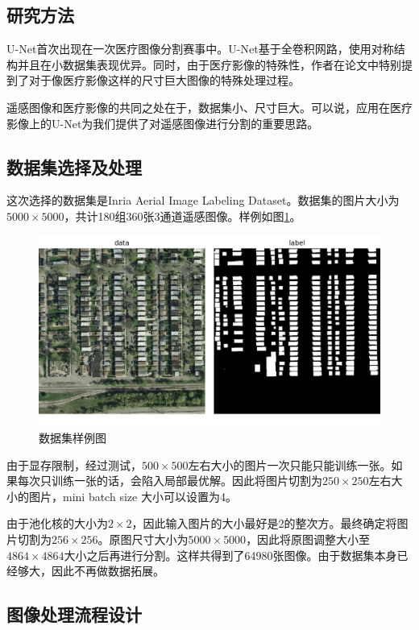 \begin{spacing}{2}
    \section{研究方法}
\end{spacing}
U-Net首次出现在一次医疗图像分割赛事中。U-Net基于全卷积网路，使用对称结构并且在小数据集表现优异。同时，由于医疗影像的特殊性，作者在论文中特别提到了对于像医疗影像这样的尺寸巨大图像的特殊处理过程。

遥感图像和医疗影像的共同之处在于，数据集小、尺寸巨大。可以说，应用在医疗影像上的U-Net为我们提供了对遥感图像进行分割的重要思路。
\subsection{数据集选择及处理}
这次选择的数据集是Inria Aerial Image Labeling Dataset\cite{maggiori2017dataset}。数据集的图片大小为$5000\times 5000$，共计180组360张3通道遥感图像。样例如图\ref{Fig:sample_dataset}。

\begin{figure}[!t]
		\centering
		\includegraphics[width=1\textwidth]{Figures/sample_dataset.png}
		\caption{数据集样例图}
		\label{Fig:sample_dataset}
\end{figure}

由于显存限制，经过测试，$500\times 500$左右大小的图片一次只能只能训练一张。如果每次只训练一张的话，会陷入局部最优解。因此将图片切割为$250\times 250$左右大小的图片，mini batch size 大小可以设置为4。

由于池化核的大小为$2\times 2$，因此输入图片的大小最好是2的整次方。最终确定将图片切割为$256\times 256$。原图尺寸大小为$5000\times 5000$，因此将原图调整大小至$4864\times 4864$大小之后再进行分割。这样共得到了64980张图像。由于数据集本身已经够大，因此不再做数据拓展。
\subsection{图像处理流程设计}
